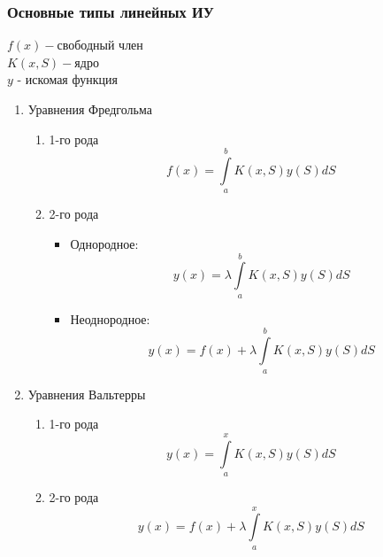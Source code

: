 \subsubsection{Основные типы линейных ИУ}
$f(x)-\text{свободный член}$\\
$K(x,S)-\text{ядро}$\\
$y$ - искомая функция
\begin{enumerate}
    \item Уравнения Фредгольма
    \begin{enumerate}
        \item 1-го рода
        $$f(x)=\int\limits_{a}^{b}K(x,S)y(S)dS$$
        \item 2-го рода
        \begin{itemize}
            \item Однородное:
            $$y(x)=\lambda\int\limits_{a}^{b}K(x,S)y(S)dS$$
            \item Неоднородное:
            $$y(x)=f(x)+\lambda\int\limits_{a}^{b}K(x,S)y(S)dS$$
        \end{itemize}
    \end{enumerate}
    \item Уравнения Вальтерры
    \begin{enumerate}
        \item 1-го рода
        $$y(x)=\int\limits_{a}^{x}K(x,S)y(S)dS$$
        \item 2-го рода
        $$y(x)=f(x)+\lambda\int\limits_{a}^{x}K(x,S)y(S)dS$$
    \end{enumerate}
\end{enumerate}

